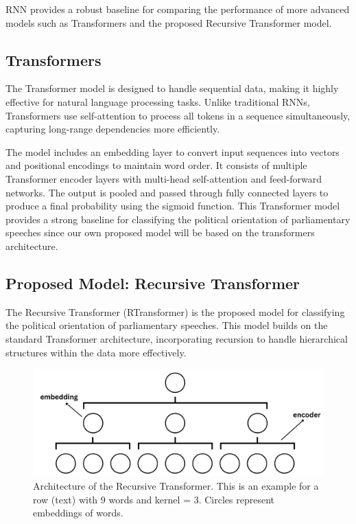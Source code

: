 \documentclass[10pt, a4paper]{article}
\begin{document}
RNN provides a robust baseline for comparing the performance of more advanced models such as Transformers and the proposed Recursive Transformer model.

\subsection{Transformers} 

The Transformer model is designed to handle sequential data, making it highly effective for natural language processing tasks. Unlike traditional RNNs, Transformers use self-attention to process all tokens in a sequence simultaneously, capturing long-range dependencies more efficiently.

The model includes an embedding layer to convert input sequences into vectors and positional encodings to maintain word order. It consists of multiple Transformer encoder layers with multi-head self-attention and feed-forward networks. The output is pooled and passed through fully connected layers to produce a final probability using the sigmoid function. This Transformer model provides a strong baseline for classifying the political orientation of parliamentary speeches since our own proposed model will be based on the transformers architecture.

\subsection{Proposed Model: Recursive Transformer} 

The Recursive Transformer (RTransformer) is the proposed model for classifying the political orientation of parliamentary speeches. This model builds on the standard Transformer architecture, incorporating recursion to handle hierarchical structures within the data more effectively. 

\begin{figure}[H]
\begin{center}
\includegraphics[width=\columnwidth]{images/RTransformer.png}
\caption{Architecture of the Recursive Transformer. This is an example for a row (text) with 9 words and kernel = 3. Circles represent embeddings of words.}
\label{fig:figure1}
\end{center}
\end{figure}
\end{document}
